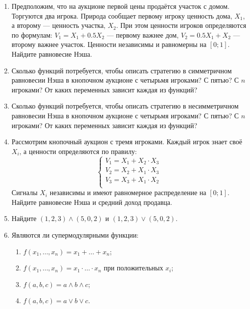 \begin{enumerate}
\begin{enumerate}
\end{enumerate}

\item Предположим, что на аукционе первой цены продаётся участок с домом. Торгуются два игрока. Природа сообщает первому игроку ценность дома, $ X_{1} $, а второму — ценность участка, $ X_{2} $. При этом ценности игроков определяются по формулам: $ V_{1}=X_{1}+0.5X_{2} $ — первому важнее дом, $ V_{2}=0.5X_{1}+X_{2} $ — второму важнее участок. Ценности независимы и равномерны на $ [0;1] $. Найдите равновесие Нэша.

\item Сколько функций потребуется, чтобы описать стратегию в симметричном равновесии Нэша в кнопочном аукционе с четырьмя игроками? С пятью? С $ n $ игроками?  От каких переменных зависит каждая из функций?

\item Сколько функций потребуется, чтобы описать стратегию в несимметричном равновесии Нэша в кнопочном аукционе с четырьмя игроками? С пятью? С $ n $ игроками? От каких переменных зависит каждая из функций?

\item Рассмотрим кнопочный аукцион с тремя игроками. Каждый игрок знает своё $ X_{i} $, а ценности определяются по правилу:
\begin{equation}
\begin{cases}
V_{1}=X_{1}+X_{2}\cdot X_{3} \\
V_{2}=X_{2}+X_{1}\cdot X_{3} \\
V_{3}=X_{3}+X_{1}\cdot X_{2} \\
\end{cases}
\end{equation}
Сигналы $ X_{i} $ независимы и имеют равномерное распределение на $ [0;1] $. Найдите равновесие Нэша и средний доход продавца.

\item Найдите $ (1,2,3)\wedge (5,0,2) $ и $ (1,2,3)\vee (5,0,2) $.

\item Являются ли супермодулярными функции:
\begin{enumerate}
\item $ f(x_{1},\ldots,x_{n})=x_{1}+\ldots+x_{n} $;
\item $ f(x_{1},\ldots,x_{n})=x_{1}\cdot \ldots \cdot x_{n} $ при положительных $ x_{i} $;
\item $ f(a,b,c)=a\wedge b\wedge c $;
\item $ f(a,b,c)=a\vee b\vee c $.
\end{enumerate}


\end{enumerate}
